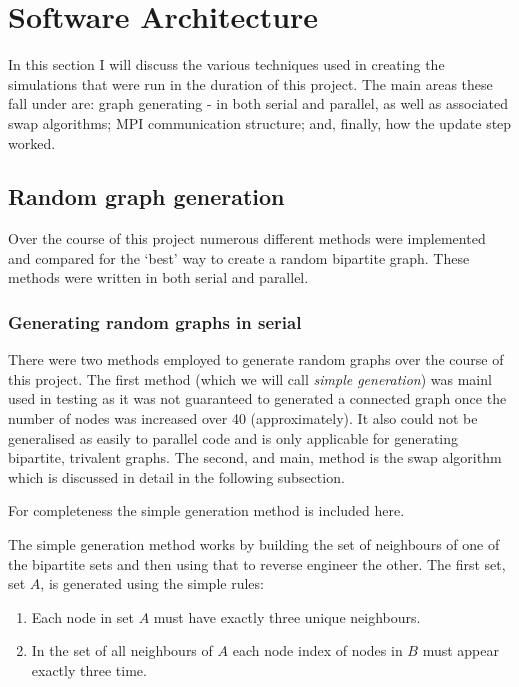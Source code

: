 \documentclass[pdftex,12pt,a4paper]{article}
\begin{document}
\newpage


\section{Software Architecture}

In this section I will discuss the various techniques used in creating the simulations that were run in the duration of this project. The main areas these fall under are: graph generating - in both serial and parallel, as well as associated swap algorithms; MPI communication structure; and, finally, how the update step worked.

\subsection{Random graph generation}

Over the course of this project numerous different methods were implemented and compared for the `best' way to create a random bipartite graph. These methods were written in both serial and parallel.

\subsubsection{Generating random graphs in serial}

There were two methods employed to generate random graphs over the course of this project. The first method (which we will call \emph{simple generation}) was mainl used in testing as it was not guaranteed to generated a connected graph once the number of nodes was increased over 40 (approximately). It also could not be generalised as easily to parallel code and is only applicable for generating bipartite, trivalent graphs. The second, and main, method is the swap algorithm which is discussed in detail in the following subsection.

For completeness the simple generation method is included here.

The simple generation method works by building the set of neighbours of one of the bipartite sets and then using that to reverse engineer the other. The first set, set $A$, is generated using the simple rules:

\begin{enumerate}
\item Each node in set $A$ must have exactly three unique neighbours.
\item In the set of all neighbours of $A$ each node index of nodes in $B$ must appear exactly three time.
\end{enumerate}
\end{document}
